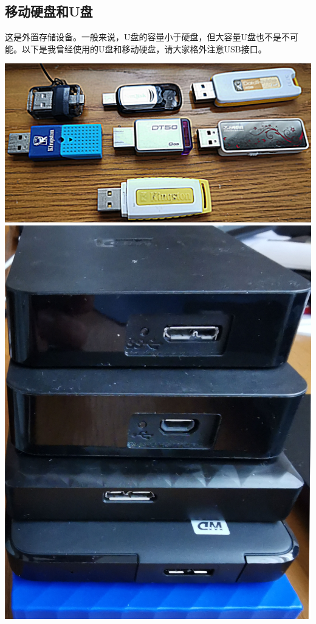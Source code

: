 \subsection{移动硬盘和U盘}
这是外置存储设备。一般来说，U盘的容量小于硬盘，但大容量U盘也不是不可能。以下是我曾经使用的U盘和移动硬盘，请大家格外注意USB接口。
\begin{center}
\includegraphics[scale=0.05]{pic/FlashDisk1}	\\\includegraphics[scale=0.05]{pic/FlashDisk2}
\end{center} \par
